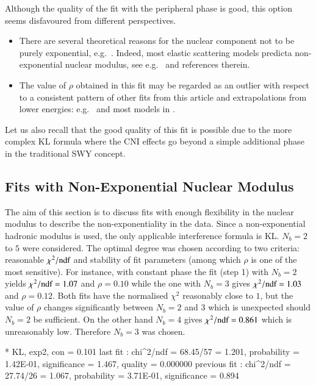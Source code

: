 Although the quality of the fit with the peripheral phase is good, this option seems disfavoured from different perspectives.
\begin{itemize}
\item There are several theoretical reasons for the nuclear component not to be purely exponential, e.g.~\cite{kmr00-multiPom,kmr12-opacity,kmr15-slope,fagundes15}. Indeed, most elastic scattering models predict\Break a non-exponential nuclear modulus, see e.g.~\cite{elegent} and references therein.
\item The value of $\rho$ obtained in this fit may be regarded as an outlier with respect to a consistent pattern of other fits from this article and extrapolations from lower energies: e.g.~\cite{fagundes12,block12,compete} and most models in \cite{elegent}.
\end{itemize}
Let us also recall that the good quality of this fit is possible due to the more complex KL formula where the CNI effects go beyond a simple additional phase in the traditional SWY concept.


\subsection{Fits with Non-Exponential Nuclear Modulus}
\label{sec:fit exp3}

The aim of this section is to discuss fits with enough flexibility in the nuclear modulus to describe the non-exponentiality in the data. Since a non-exponential hadronic modulus is used, the only applicable interference formula is KL. $N_b=2$ to $5$ were considered. The optimal degree was chosen according to two criteria: reasonable $\chi^2/\hbox{ndf}$ and stability of fit parameters (among which $\rho$ is one of the most sensitive). For instance, with constant phase the fit (step 1) with $N_b=2$ yields $\chi^2/\hbox{ndf} = 1.07$ and $\rho = 0.10$ while the one with $N_b=3$ gives $\chi^2/\hbox{ndf} = 1.03$ and $\rho = 0.12$. Both fits have the normalised $\chi^2$ reasonably close to $1$, but the value of $\rho$ changes significantly between $N_b=2$ and $3$ which is unexpected should $N_b=2$ be sufficient. On the other hand $N_b=4$ gives $\chi^2/\hbox{ndf} = 0.861$ which is unreasonably low. Therefore $N_b=3$ was chosen.

\iffalse
* KL, exp2, con
\rh       =   0.101 
last fit     : chi^2/ndf = 68.45/57 = 1.201, probability = 1.42E-01, significance = 1.467, quality = 0.000000
previous fit : chi^2/ndf = 27.74/26 = 1.067, probability = 3.71E-01, significance = 0.894

